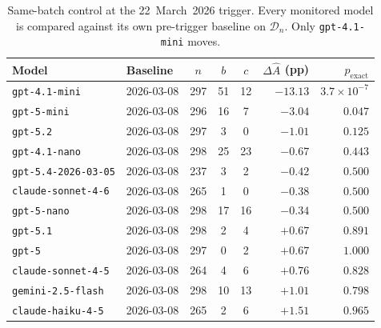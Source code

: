 \begin{table}[htbp]
    \centering
    \footnotesize
    \caption{Same-batch control at the 22~March~2026 trigger. Every monitored
    model is compared against its own pre-trigger baseline on
    $\mathcal{D}_n$. Only \texttt{gpt-4.1-mini} moves.}
    \label{tab:control-same-week}
    \begin{tabular}{llcccrr}
    \toprule
    Model & Baseline & $n$ & $b$ & $c$ & $\Delta\widehat{A}$ (pp) & $p_{\mathrm{exact}}$ \\
    \midrule
    \texttt{gpt-4.1-mini} & 2026-03-08 & 297 & 51 & 12 & $-13.13$ & $3.7\times 10^{-7}$ \\
    \texttt{gpt-5-mini} & 2026-03-08 & 296 & 16 & 7 & $-3.04$ & $0.047$ \\
    \texttt{gpt-5.2} & 2026-03-08 & 297 & 3 & 0 & $-1.01$ & $0.125$ \\
    \texttt{gpt-4.1-nano} & 2026-03-08 & 298 & 25 & 23 & $-0.67$ & $0.443$ \\
    \texttt{gpt-5.4-2026-03-05} & 2026-03-08 & 237 & 3 & 2 & $-0.42$ & $0.500$ \\
    \texttt{claude-sonnet-4-6} & 2026-03-08 & 265 & 1 & 0 & $-0.38$ & $0.500$ \\
    \texttt{gpt-5-nano} & 2026-03-08 & 298 & 17 & 16 & $-0.34$ & $0.500$ \\
    \texttt{gpt-5.1} & 2026-03-08 & 298 & 2 & 4 & $+0.67$ & $0.891$ \\
    \texttt{gpt-5} & 2026-03-08 & 297 & 0 & 2 & $+0.67$ & $1.000$ \\
    \texttt{claude-sonnet-4-5} & 2026-03-08 & 264 & 4 & 6 & $+0.76$ & $0.828$ \\
    \texttt{gemini-2.5-flash} & 2026-03-08 & 298 & 10 & 13 & $+1.01$ & $0.798$ \\
    \texttt{claude-haiku-4-5} & 2026-03-08 & 265 & 2 & 6 & $+1.51$ & $0.965$ \\
    \bottomrule
    \end{tabular}
\end{table}
